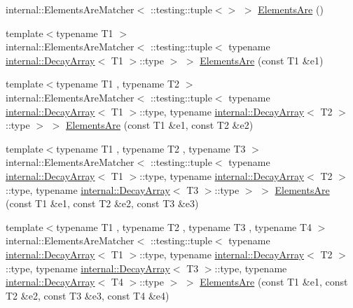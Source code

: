 \begin{DoxyCompactItemize}
\item 
internal\+::\+Elements\+Are\+Matcher$<$ \+::testing\+::tuple$<$$>$ $>$ \mbox{\hyperlink{namespacetesting_a79cf4ae694bf8231dcf283b325405f27}{Elements\+Are}} ()
\item 
{\footnotesize template$<$typename T1 $>$ }\\internal\+::\+Elements\+Are\+Matcher$<$ \+::testing\+::tuple$<$ typename \mbox{\hyperlink{structtesting_1_1internal_1_1DecayArray}{internal\+::\+Decay\+Array}}$<$ T1 $>$\+::type $>$ $>$ \mbox{\hyperlink{namespacetesting_aa35aa6c9638d989e9f4aaa6009f60589}{Elements\+Are}} (const T1 \&e1)
\item 
{\footnotesize template$<$typename T1 , typename T2 $>$ }\\internal\+::\+Elements\+Are\+Matcher$<$ \+::testing\+::tuple$<$ typename \mbox{\hyperlink{structtesting_1_1internal_1_1DecayArray}{internal\+::\+Decay\+Array}}$<$ T1 $>$\+::type, typename \mbox{\hyperlink{structtesting_1_1internal_1_1DecayArray}{internal\+::\+Decay\+Array}}$<$ T2 $>$\+::type $>$ $>$ \mbox{\hyperlink{namespacetesting_a864f77fe7774308d4c54f1f52f9040cf}{Elements\+Are}} (const T1 \&e1, const T2 \&e2)
\item 
{\footnotesize template$<$typename T1 , typename T2 , typename T3 $>$ }\\internal\+::\+Elements\+Are\+Matcher$<$ \+::testing\+::tuple$<$ typename \mbox{\hyperlink{structtesting_1_1internal_1_1DecayArray}{internal\+::\+Decay\+Array}}$<$ T1 $>$\+::type, typename \mbox{\hyperlink{structtesting_1_1internal_1_1DecayArray}{internal\+::\+Decay\+Array}}$<$ T2 $>$\+::type, typename \mbox{\hyperlink{structtesting_1_1internal_1_1DecayArray}{internal\+::\+Decay\+Array}}$<$ T3 $>$\+::type $>$ $>$ \mbox{\hyperlink{namespacetesting_a0be8a0ad5d7461fd1da13ecac4e21e2a}{Elements\+Are}} (const T1 \&e1, const T2 \&e2, const T3 \&e3)
\item 
{\footnotesize template$<$typename T1 , typename T2 , typename T3 , typename T4 $>$ }\\internal\+::\+Elements\+Are\+Matcher$<$ \+::testing\+::tuple$<$ typename \mbox{\hyperlink{structtesting_1_1internal_1_1DecayArray}{internal\+::\+Decay\+Array}}$<$ T1 $>$\+::type, typename \mbox{\hyperlink{structtesting_1_1internal_1_1DecayArray}{internal\+::\+Decay\+Array}}$<$ T2 $>$\+::type, typename \mbox{\hyperlink{structtesting_1_1internal_1_1DecayArray}{internal\+::\+Decay\+Array}}$<$ T3 $>$\+::type, typename \mbox{\hyperlink{structtesting_1_1internal_1_1DecayArray}{internal\+::\+Decay\+Array}}$<$ T4 $>$\+::type $>$ $>$ \mbox{\hyperlink{namespacetesting_a4109ce480e0145bfce7c46120afb36d3}{Elements\+Are}} (const T1 \&e1, const T2 \&e2, const T3 \&e3, const T4 \&e4)
$$
\end{DoxyCompactItemize}
